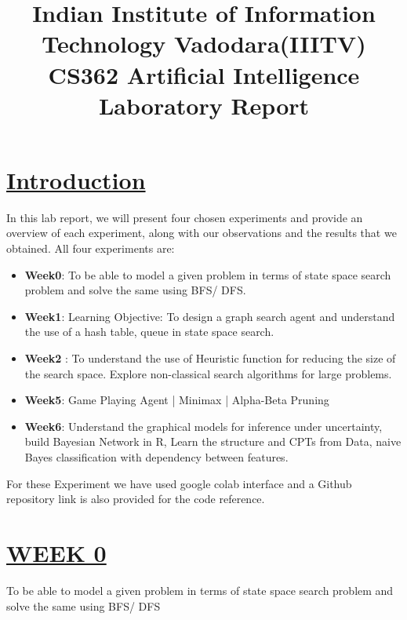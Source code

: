 \documentclass[15pt,journal]{IEEEtran}
\begin{document}
\title{\LARGE{ \textbf{ Indian Institute of Information Technology Vadodara(IIITV)}}\\ \LARGE{CS362 Artificial Intelligence Laboratory Report}}



\author{\Large{
}%
}




\maketitle

\section{\large{\underline{Introduction}}}
In this lab report, we will present four chosen experiments and provide an overview of each experiment, along with our observations and the results that we obtained. All four experiments are: 
\begin{itemize}
    \item \textbf{Week0}: To be able to model a given problem in terms of state space search problem and solve the same using BFS/ DFS.
    \item \textbf{Week1}: Learning Objective: To design a graph search agent and understand the use of a hash table, queue in state space search.
    \item \textbf{Week2} : To understand the use of Heuristic function for reducing the size of the search space.  Explore non-classical search algorithms for large problems.
    \item \textbf{Week5}: Game Playing Agent | Minimax | Alpha-Beta Pruning
    \item \textbf{Week6}: Understand the graphical models for inference under uncertainty, build Bayesian Network in R, Learn the structure and CPTs from Data, naive Bayes classification with dependency between features.  
\end{itemize}
For these Experiment we have used google colab interface and a Github repository link is also provided for the code reference.
\section{\large{\underline{WEEK 0}}}
To be able to model a given problem in terms of state space search problem and solve the same using BFS/ DFS
\end{document}
